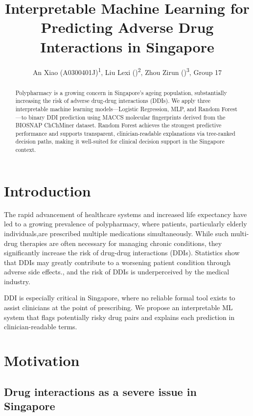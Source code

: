 \documentclass[letterpaper]{article} %
\title{Interpretable Machine Learning for Predicting Adverse Drug Interactions in Singapore}
\author{
    An Xiao (A0300401J)\textsuperscript{\rm 1},
    Liu Lexi ()\textsuperscript{\rm 2},
    Zhou Zirun ()\textsuperscript{\rm 3},
    Group 17
}
\begin{document}
\maketitle

\begin{abstract}
Polypharmacy is a growing concern in Singapore's ageing population, substantially increasing the risk of adverse drug-drug interactions (DDIs). We apply three interpretable machine learning models---Logistic Regression, MLP, and Random Forest---to binary DDI prediction using MACCS molecular fingerprints derived from the BIOSNAP ChChMiner dataset. Random Forest achieves the strongest predictive performance and supports transparent, clinician-readable explanations via tree-ranked decision paths, making it well-suited for clinical decision support in the Singapore context.
\end{abstract}

\section{Introduction}

The rapid advancement of healthcare systems and increased life expectancy have led to a growing prevalence of polypharmacy, where patients, particularly elderly individuals,are prescribed multiple medications simultaneously. While such multi-drug therapies are often necessary for managing chronic conditions, they significantly increase the risk of drug-drug interactions (DDIs). Statistics show that DDIs may greatly contribute to a worsening patient condition through adverse side effects.\cite{Chan2016:chan}, and the risk of DDIs is underperceived by the medical industry.\cite{polypharmacy}

DDI is especially critical in Singapore,\cite{Ho2023} where no reliable formal tool exists to assist clinicians at the point of prescribing. We propose an interpretable ML system that flags potentially risky drug pairs and explains each prediction in clinician-readable terms.


\section{Motivation}

\subsection{Drug interactions as a severe issue in Singapore}
\end{document}

